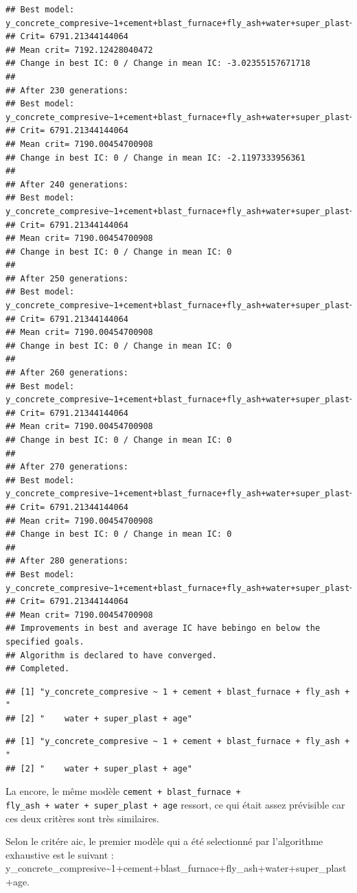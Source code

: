 \documentclass[
  12pt,
]{article}
\begin{document}
\begin{verbatim}
## Best model: y_concrete_compresive~1+cement+blast_furnace+fly_ash+water+super_plast+age
## Crit= 6791.21344144064
## Mean crit= 7192.12428040472
## Change in best IC: 0 / Change in mean IC: -3.02355157671718
## 
## After 230 generations:
## Best model: y_concrete_compresive~1+cement+blast_furnace+fly_ash+water+super_plast+age
## Crit= 6791.21344144064
## Mean crit= 7190.00454700908
## Change in best IC: 0 / Change in mean IC: -2.1197333956361
## 
## After 240 generations:
## Best model: y_concrete_compresive~1+cement+blast_furnace+fly_ash+water+super_plast+age
## Crit= 6791.21344144064
## Mean crit= 7190.00454700908
## Change in best IC: 0 / Change in mean IC: 0
## 
## After 250 generations:
## Best model: y_concrete_compresive~1+cement+blast_furnace+fly_ash+water+super_plast+age
## Crit= 6791.21344144064
## Mean crit= 7190.00454700908
## Change in best IC: 0 / Change in mean IC: 0
## 
## After 260 generations:
## Best model: y_concrete_compresive~1+cement+blast_furnace+fly_ash+water+super_plast+age
## Crit= 6791.21344144064
## Mean crit= 7190.00454700908
## Change in best IC: 0 / Change in mean IC: 0
## 
## After 270 generations:
## Best model: y_concrete_compresive~1+cement+blast_furnace+fly_ash+water+super_plast+age
## Crit= 6791.21344144064
## Mean crit= 7190.00454700908
## Change in best IC: 0 / Change in mean IC: 0
## 
## After 280 generations:
## Best model: y_concrete_compresive~1+cement+blast_furnace+fly_ash+water+super_plast+age
## Crit= 6791.21344144064
## Mean crit= 7190.00454700908
## Improvements in best and average IC have bebingo en below the specified goals.
## Algorithm is declared to have converged.
## Completed.
\end{verbatim}

\begin{verbatim}
## [1] "y_concrete_compresive ~ 1 + cement + blast_furnace + fly_ash + "
## [2] "    water + super_plast + age"
\end{verbatim}

\begin{verbatim}
## [1] "y_concrete_compresive ~ 1 + cement + blast_furnace + fly_ash + "
## [2] "    water + super_plast + age"
\end{verbatim}

La encore, le même modèle \texttt{cement\ +\ blast\_furnace\ +}
\texttt{fly\_ash\ +\ water\ +\ super\_plast\ +\ age} ressort, ce qui
était assez prévisible car ces deux critères sont très similaires.

Selon le critére aic, le premier modèle qui a été selectionné par
l'algorithme exhaustive est le suivant :
y\_concrete\_compresive\textasciitilde1+cement+blast\_furnace+fly\_ash+water+super\_plast+age.
\end{document}
